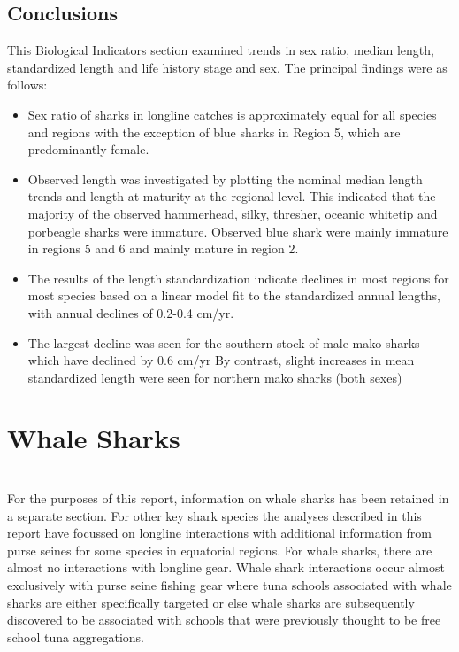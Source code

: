 \documentclass[12pt]{SCreport}
\begin{document}
            
\subsection{Conclusions}

This Biological Indicators section examined trends in sex ratio, median length, standardized length and life history stage and sex.  The principal findings were as follows:
\begin{itemize}
\item Sex ratio of sharks in longline catches is approximately equal for all species and regions with the exception of blue sharks in Region 5, which are predominantly female.
\item Observed length was investigated by plotting the nominal median length trends and length at
maturity at the regional level. This indicated that the majority of the observed hammerhead, silky,
thresher, oceanic whitetip and porbeagle sharks were immature. Observed blue shark were mainly
immature in regions 5 and 6 and mainly mature in region 2.
\item The results of the length standardization indicate declines in most regions for most species based
on a linear model fit to the standardized annual lengths, with annual declines of 0.2-0.4 cm/yr.
\item The largest decline was seen for the southern stock of male mako sharks which have declined by 0.6 cm/yr
By contrast, slight increases in mean standardized length were seen for northern mako sharks (both sexes)
\end{itemize}

      
 \clearpage     
  
\section{Whale Sharks}
\\ 

For the purposes of this report, information on whale sharks has been retained in a separate section. For other key shark species the analyses described in this report have focussed on longline interactions with additional information from purse seines for some species in equatorial regions. For whale sharks, there are almost no interactions with longline gear. Whale shark interactions occur almost exclusively with purse seine fishing gear where tuna schools associated with whale sharks are either specifically targeted or else whale sharks are subsequently discovered to be associated with schools that were previously thought to be free school tuna aggregations.
\end{document}
